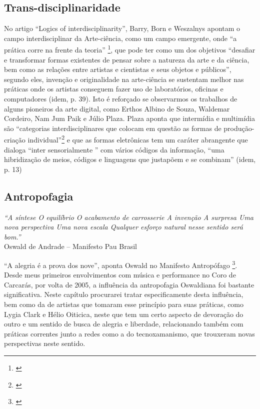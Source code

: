 \subsection{Trans-disciplinaridade}
No artigo ``Logics of interdisciplinarity'', Barry, Born e Weszalnys apontam o campo interdisciplinar da Arte-ciência, como um campo emergente, onde ``a prática corre na frente da teoria'' \footnote{\cite{Barry2008}}, que pode ter como um dos objetivos ``desafiar e transformar formas existentes de pensar sobre a natureza da arte e da ciência, bem como as relações entre artistas e cientistas e seus objetos e públicos'', segundo eles, invenção e originalidade na arte-ciência se sustentam melhor nas práticas onde os artistas conseguem fazer uso de laboratórios, oficinas e computadores (idem, p. 39). Isto é reforçado se observarmos os trabalhos de alguns pioneiros da arte digital, como Erthos Albino de Souza, Waldemar Cordeiro, Nam Jum Paik e Júlio Plaza. 
Plaza aponta que intermídia e multimídia são ``categorias interdisciplinares  que colocam em questão as formas de produção-criação individual''\footnote{\cite[66]{JulioPlaza1969}} e que as formas eletrônicas tem um caráter abrangente que dialoga ``inter sensorialmente '' com vários códigos da informação, ``uma hibridização de meios, códigos e linguagens que justapõem e se combinam'' (idem, p. 13)

\subsection{Antropofagia}

    \begin{flushright}
        \textit{``A síntese
O equilíbrio
O acabamento de carrosserie
A invenção
A surpresa
Uma nova perspectiva
Uma nova escala
Qualquer esforço natural nesse sentido será bom.''} \\
Oswald de Andrade – Manifesto Pau Brasil    \end{flushright}

``A alegria é a prova dos nove'', aponta Oswald no Manifesto Antropófago \footnote{\cite{Andrade1928}}. Desde meus primeiros envolvimentos com música e performance no Coro de Carcarás, por volta de 2005, a influência da antropofagia Oswaldiana foi bastante significativa. Neste capítulo procurarei tratar especificamente desta influência, bem como da de artistas que tomaram esse princípio para suas práticas, como Lygia Clark e Hélio Oiticica, neste que tem um certo aspecto de devoração do outro e um sentido de busca de alegria e liberdade, relacionando também com práticas correntes junto a redes como a do tecnoxamanismo, que trouxeram novas perspectivas neste sentido.

